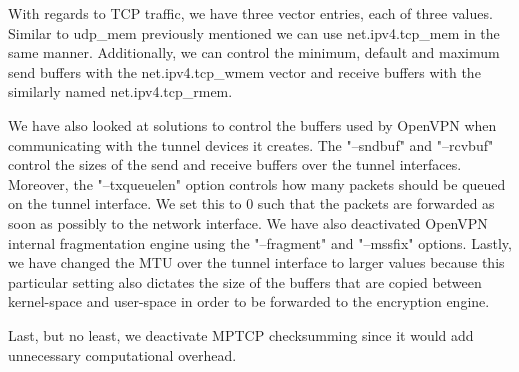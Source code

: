 With regards to TCP traffic, we have three vector entries, each of three
values. Similar to udp_mem previously mentioned we can use net.ipv4.tcp_mem in
the same manner. Additionally, we can control the minimum, default and maximum
send buffers with the net.ipv4.tcp_wmem vector and receive buffers with the
similarly named net.ipv4.tcp_rmem.

We have also looked at solutions to control the buffers used by OpenVPN when
communicating with the tunnel devices it creates. The "--sndbuf" and
"--rcvbuf" control the sizes of the send and receive buffers over the tunnel
interfaces. Moreover, the "--txqueuelen" option controls how many packets
should be queued on the tunnel interface. We set this to 0 such that the
packets are forwarded as soon as possibly to the network interface. We have
also deactivated OpenVPN internal fragmentation engine using the "--fragment"
and "--mssfix" options. Lastly, we have changed the MTU over the tunnel
interface to larger values because this particular setting also dictates the
size of the buffers that are copied between kernel-space and user-space in
order to be forwarded to the encryption engine.

Last, but no least, we deactivate MPTCP checksumming since it would add
unnecessary computational overhead.
